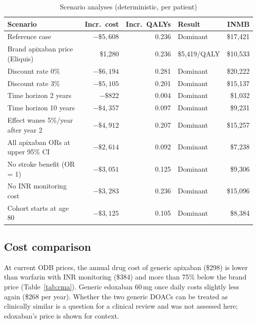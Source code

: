 \documentclass[11pt,letterpaper]{article}
\begin{document}
\begin{table}[H]
\centering
\caption{Scenario analyses (deterministic, per patient)}
\label{tab:scenarios}
\small
\begin{tabular}{@{}lrrlr@{}}
\toprule
Scenario & Incr.\ cost & Incr.\ QALYs & Result & INMB \\
\midrule
Reference case & $-\$5,608$ & 0.236 & Dominant & \$17,421 \\
Brand apixaban price (Eliquis) & \$1,280 & 0.236 & \$5,419/QALY & \$10,533 \\
Discount rate 0\% & $-\$6,194$ & 0.281 & Dominant & \$20,222 \\
Discount rate 3\% & $-\$5,105$ & 0.201 & Dominant & \$15,137 \\
Time horizon 2 years & $-\$822$ & 0.004 & Dominant & \$1,032 \\
Time horizon 10 years & $-\$4,357$ & 0.097 & Dominant & \$9,231 \\
Effect wanes 5\%/year after year 2 & $-\$4,912$ & 0.207 & Dominant & \$15,257 \\
All apixaban ORs at upper 95\% CI & $-\$2,614$ & 0.092 & Dominant & \$7,238 \\
No stroke benefit (OR = 1) & $-\$3,051$ & 0.125 & Dominant & \$9,306 \\
No INR monitoring cost & $-\$3,283$ & 0.236 & Dominant & \$15,096 \\
Cohort starts at age 80 & $-\$3,125$ & 0.105 & Dominant & \$8,384 \\
\bottomrule
\end{tabular}
\end{table}

\subsection{Cost comparison}

At current ODB prices, the annual drug cost of generic apixaban (\$298) is lower than warfarin
with INR monitoring (\$384) and more than 75\% below the brand price (Table~\ref{tab:cma}).
Generic edoxaban 60\,mg once daily costs slightly less again (\$268 per year). Whether the two
generic DOACs can be treated as clinically similar is a question for a clinical review and was not
assessed here; edoxaban's price is shown for context.
\end{document}
